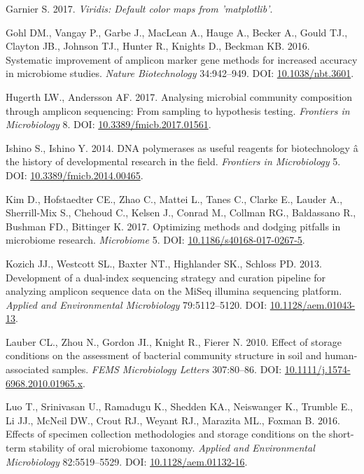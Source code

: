 \documentclass[12pt,]{article}
\begin{document}
\hypertarget{ref-viridis_citation_2017}{}
Garnier S. 2017. \emph{Viridis: Default color maps from 'matplotlib'}.

\hypertarget{ref-taq_Gohl_2016}{}
Gohl DM., Vangay P., Garbe J., MacLean A., Hauge A., Becker A., Gould
TJ., Clayton JB., Johnson TJ., Hunter R., Knights D., Beckman KB. 2016.
Systematic improvement of amplicon marker gene methods for increased
accuracy in microbiome studies. \emph{Nature Biotechnology} 34:942--949.
DOI: \href{https://doi.org/10.1038/nbt.3601}{10.1038/nbt.3601}.

\hypertarget{ref-review_Hugerth_2017}{}
Hugerth LW., Andersson AF. 2017. Analysing microbial community
composition through amplicon sequencing: From sampling to hypothesis
testing. \emph{Frontiers in Microbiology} 8. DOI:
\href{https://doi.org/10.3389/fmicb.2017.01561}{10.3389/fmicb.2017.01561}.

\hypertarget{ref-polymerase_Ishino_2014}{}
Ishino S., Ishino Y. 2014. DNA polymerases as useful reagents for
biotechnology â the history of developmental research in the field.
\emph{Frontiers in Microbiology} 5. DOI:
\href{https://doi.org/10.3389/fmicb.2014.00465}{10.3389/fmicb.2014.00465}.

\hypertarget{ref-review_Kim_2017}{}
Kim D., Hofstaedter CE., Zhao C., Mattei L., Tanes C., Clarke E., Lauder
A., Sherrill-Mix S., Chehoud C., Kelsen J., Conrad M., Collman RG.,
Baldassano R., Bushman FD., Bittinger K. 2017. Optimizing methods and
dodging pitfalls in microbiome research. \emph{Microbiome} 5. DOI:
\href{https://doi.org/10.1186/s40168-017-0267-5}{10.1186/s40168-017-0267-5}.

\hypertarget{ref-protocol_Kozich_2013}{}
Kozich JJ., Westcott SL., Baxter NT., Highlander SK., Schloss PD. 2013.
Development of a dual-index sequencing strategy and curation pipeline
for analyzing amplicon sequence data on the MiSeq illumina sequencing
platform. \emph{Applied and Environmental Microbiology} 79:5112--5120.
DOI: \href{https://doi.org/10.1128/aem.01043-13}{10.1128/aem.01043-13}.

\hypertarget{ref-storage_Lauber_2010}{}
Lauber CL., Zhou N., Gordon JI., Knight R., Fierer N. 2010. Effect of
storage conditions on the assessment of bacterial community structure in
soil and human-associated samples. \emph{FEMS Microbiology Letters}
307:80--86. DOI:
\href{https://doi.org/10.1111/j.1574-6968.2010.01965.x}{10.1111/j.1574-6968.2010.01965.x}.

\hypertarget{ref-preservation_Luo_2016}{}
Luo T., Srinivasan U., Ramadugu K., Shedden KA., Neiswanger K., Trumble
E., Li JJ., McNeil DW., Crout RJ., Weyant RJ., Marazita ML., Foxman B.
2016. Effects of specimen collection methodologies and storage
conditions on the short-term stability of oral microbiome taxonomy.
\emph{Applied and Environmental Microbiology} 82:5519--5529. DOI:
\href{https://doi.org/10.1128/aem.01132-16}{10.1128/aem.01132-16}.
\end{document}
